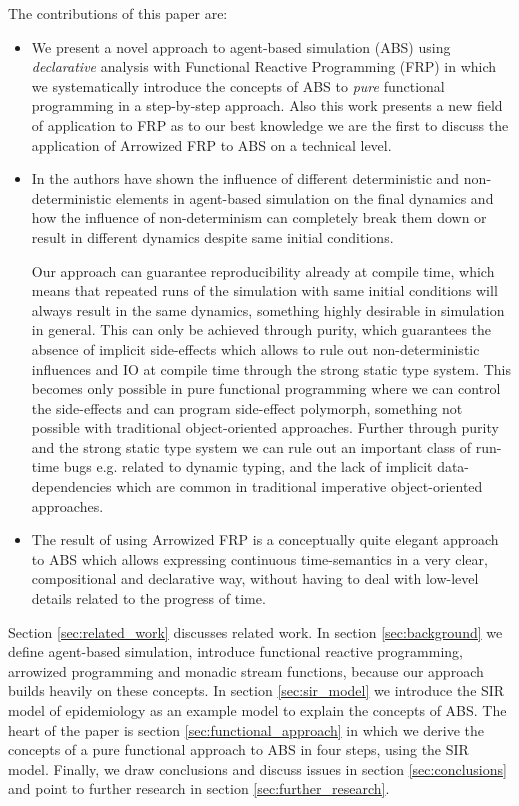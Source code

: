 The contributions of this paper are:
\begin{itemize}
	\item We present a novel approach to agent-based simulation (ABS) using \textit{declarative} analysis with Functional Reactive Programming (FRP) in which we systematically introduce the concepts of ABS to \textit{pure} functional programming in a step-by-step approach. Also this work presents a new field of application to FRP as to our best knowledge we are the first to discuss the application of Arrowized FRP to ABS on a technical level.
	
	\item In \cite{thaler_art_2017} the authors have shown the influence of different deterministic and non-deterministic elements in agent-based simulation on the final dynamics and how the influence of non-determinism can completely break them down or result in different dynamics despite same initial conditions.
	
	Our approach can guarantee reproducibility already at compile time, which means that repeated runs of the simulation with same initial conditions will always result in the same dynamics, something highly desirable in simulation in general. This can only be achieved through purity, which guarantees the absence of implicit side-effects which allows to rule out non-deterministic influences and IO at compile time through the strong static type system. This becomes only possible in pure functional programming where we can control the side-effects and can program side-effect polymorph, something not possible with traditional object-oriented approaches. Further through purity and the strong static type system we can rule out an important class of run-time bugs e.g. related to dynamic typing, and the lack of implicit data-dependencies which are common in traditional imperative object-oriented approaches.
	
	\item The result of using Arrowized FRP is a conceptually quite elegant approach to ABS which allows expressing continuous time-semantics in a very clear, compositional and declarative way, without having to deal with low-level details related to the progress of time.
\end{itemize}

Section \ref{sec:related_work} discusses related work. In section \ref{sec:background} we define agent-based simulation, introduce functional reactive programming, arrowized programming and monadic stream functions, because our approach builds heavily on these concepts. In section \ref{sec:sir_model} we introduce the SIR model of epidemiology as an example model to explain the concepts of ABS. The heart of the paper is section \ref{sec:functional_approach} in which we derive the concepts of a pure functional approach to ABS in four steps, using the SIR model. Finally, we draw conclusions and discuss issues in section \ref{sec:conclusions} and point to further research in section \ref{sec:further_research}.

